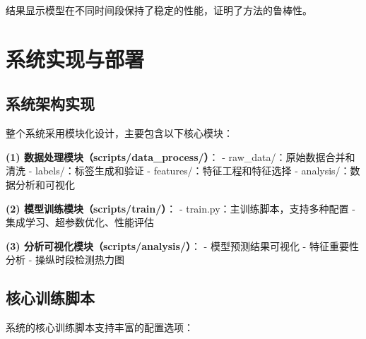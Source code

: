 \documentclass[12pt,a4paper]{article}
\begin{document}
结果显示模型在不同时间段保持了稳定的性能，证明了方法的鲁棒性。

\section{系统实现与部署}

\subsection{系统架构实现}

整个系统采用模块化设计，主要包含以下核心模块：

\textbf{(1) 数据处理模块（scripts/data\_process/）}：
- raw\_data/：原始数据合并和清洗
- labels/：标签生成和验证
- features/：特征工程和特征选择
- analysis/：数据分析和可视化

\textbf{(2) 模型训练模块（scripts/train/）}：
- train.py：主训练脚本，支持多种配置
- 集成学习、超参数优化、性能评估

\textbf{(3) 分析可视化模块（scripts/analysis/）}：
- 模型预测结果可视化
- 特征重要性分析
- 操纵时段检测热力图

\subsection{核心训练脚本}

系统的核心训练脚本支持丰富的配置选项：
\end{document}
